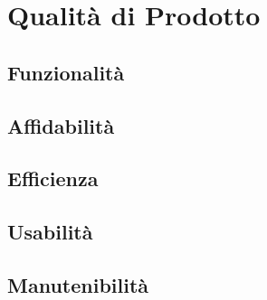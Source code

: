 \section{Qualità di Prodotto}
\subsection{Funzionalità}
\subsection{Affidabilità}
\subsection{Efficienza}
\subsection{Usabilità}
\subsection{Manutenibilità}
